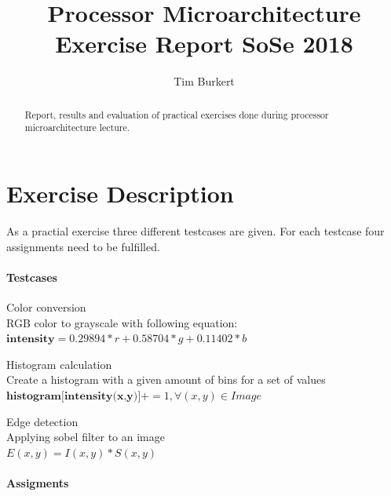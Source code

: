 \documentclass[a4paper,fontsize=12pt]{scrartcl}
\begin{document}
	
	\title{Processor Microarchitecture Exercise Report SoSe 2018}
	\author{Tim Burkert}
	
	\maketitle
	
	\begin{abstract}
		Report, results and evaluation of practical exercises done during processor microarchitecture lecture.
	\end{abstract}
	
	\section{Exercise Description}
	As a practial exercise three different testcases are given. For each testcase four assignments need to be fulfilled.
	
	\paragraph{Testcases}
	
	\begin{description}
		\item Color conversion \\
		RGB color to grayscale with following equation: \\
		$\textbf{intensity} = 0.29894*r + 0.58704*g + 0.11402*b$
		
		\item Histogram calculation \\
		Create a histogram with a given amount of bins for a set of values \\
		$\textbf{histogram[intensity(x,y)]} += 1, \forall (x,y) \in Image$
		
		\item Edge detection \\
		Applying sobel filter to an image \\
		$E(x,y) = I(x,y) * S(x,y)$
	\end{description}
	
	\paragraph{Assigments}
	
\end{document}
